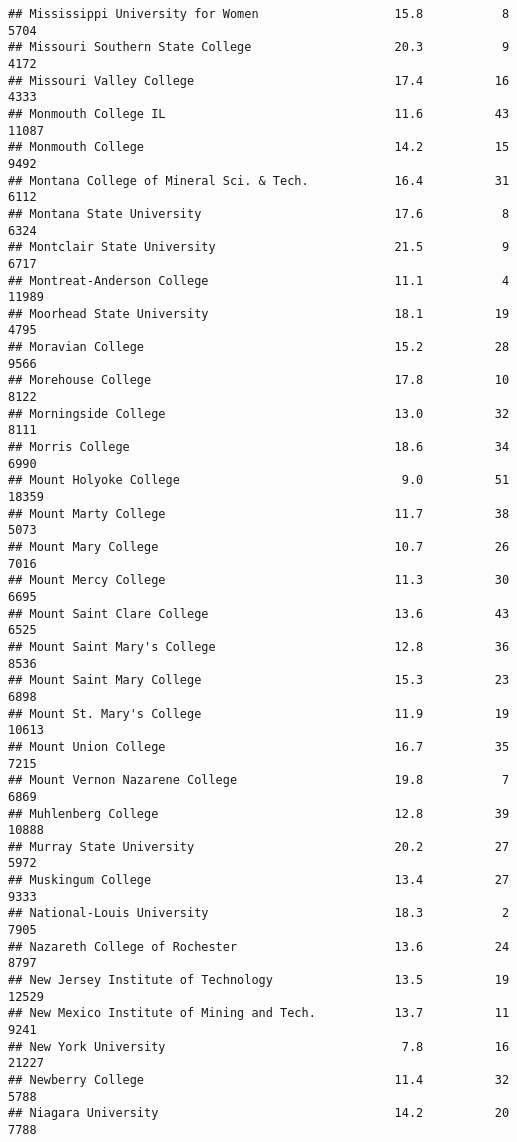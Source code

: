\documentclass[
]{article}
\begin{document}
\begin{verbatim}
## Mississippi University for Women                   15.8           8   5704
## Missouri Southern State College                    20.3           9   4172
## Missouri Valley College                            17.4          16   4333
## Monmouth College IL                                11.6          43  11087
## Monmouth College                                   14.2          15   9492
## Montana College of Mineral Sci. & Tech.            16.4          31   6112
## Montana State University                           17.6           8   6324
## Montclair State University                         21.5           9   6717
## Montreat-Anderson College                          11.1           4  11989
## Moorhead State University                          18.1          19   4795
## Moravian College                                   15.2          28   9566
## Morehouse College                                  17.8          10   8122
## Morningside College                                13.0          32   8111
## Morris College                                     18.6          34   6990
## Mount Holyoke College                               9.0          51  18359
## Mount Marty College                                11.7          38   5073
## Mount Mary College                                 10.7          26   7016
## Mount Mercy College                                11.3          30   6695
## Mount Saint Clare College                          13.6          43   6525
## Mount Saint Mary's College                         12.8          36   8536
## Mount Saint Mary College                           15.3          23   6898
## Mount St. Mary's College                           11.9          19  10613
## Mount Union College                                16.7          35   7215
## Mount Vernon Nazarene College                      19.8           7   6869
## Muhlenberg College                                 12.8          39  10888
## Murray State University                            20.2          27   5972
## Muskingum College                                  13.4          27   9333
## National-Louis University                          18.3           2   7905
## Nazareth College of Rochester                      13.6          24   8797
## New Jersey Institute of Technology                 13.5          19  12529
## New Mexico Institute of Mining and Tech.           13.7          11   9241
## New York University                                 7.8          16  21227
## Newberry College                                   11.4          32   5788
## Niagara University                                 14.2          20   7788

\end{verbatim}
\end{document}
